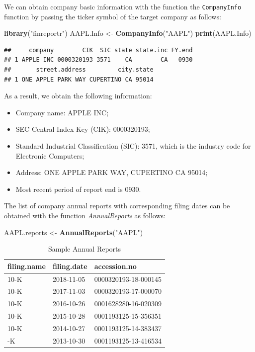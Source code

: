 \documentclass[]{book}
\newenvironment{Shaded}{\begin{snugshade}}{\end{snugshade}}
\newcommand{\KeywordTok}[1]{\textcolor[rgb]{0.13,0.29,0.53}{\textbf{#1}}}
\newcommand{\StringTok}[1]{\textcolor[rgb]{0.31,0.60,0.02}{#1}}
\newcommand{\NormalTok}[1]{#1}
\providecommand{\tightlist}{%
  \setlength{\itemsep}{0pt}\setlength{\parskip}{0pt}}
\theoremstyle{definition}
\theoremstyle{definition}
\theoremstyle{definition}
\theoremstyle{remark}
\begin{document}
We can obtain company basic information with the function the
\texttt{CompanyInfo} function by passing the ticker symbol of the target
company as follows:

\begin{Shaded}
\begin{Highlighting}[]
\KeywordTok{library}\NormalTok{(}\StringTok{"finreportr"}\NormalTok{)}
\NormalTok{AAPL.Info <-}\StringTok{ }\KeywordTok{CompanyInfo}\NormalTok{(}\StringTok{"AAPL"}\NormalTok{)}
\KeywordTok{print}\NormalTok{(AAPL.Info)}
\end{Highlighting}
\end{Shaded}

\begin{verbatim}
##     company        CIK  SIC state state.inc FY.end
## 1 APPLE INC 0000320193 3571    CA        CA   0930
##       street.address         city.state
## 1 ONE APPLE PARK WAY CUPERTINO CA 95014
\end{verbatim}

As a result, we obtain the following information:

\begin{itemize}
\tightlist
\item
  Company name: APPLE INC;
\item
  SEC Central Index Key (CIK): 0000320193;\\
\item
  Standard Industrial Classification (SIC): 3571, which is the industry
  code for Electronic Computers;
\item
  Address: ONE APPLE PARK WAY, CUPERTINO CA 95014;
\item
  Most recent period of report end is 0930.
\end{itemize}

The list of company annual reports with corresponding filing dates can
be obtained with the function \emph{AnnualReports} as follows:

\begin{Shaded}
\begin{Highlighting}[]
\NormalTok{AAPL.reports <-}\StringTok{ }\KeywordTok{AnnualReports}\NormalTok{(}\StringTok{"AAPL"}\NormalTok{)}
\end{Highlighting}
\end{Shaded}

\begin{table}[t]

\caption{\label{tab:unnamed-chunk-23}Sample Annual Reports}
\centering
\begin{tabular}{lll}
\toprule
filing.name & filing.date & accession.no\\
\midrule
10-K & 2018-11-05 & 0000320193-18-000145\\
10-K & 2017-11-03 & 0000320193-17-000070\\
10-K & 2016-10-26 & 0001628280-16-020309\\
10-K & 2015-10-28 & 0001193125-15-356351\\
10-K & 2014-10-27 & 0001193125-14-383437\\
\addlinespace
10-K & 2013-10-30 & 0001193125-13-416534\\
\bottomrule
\end{tabular}
\end{table}
\end{document}
